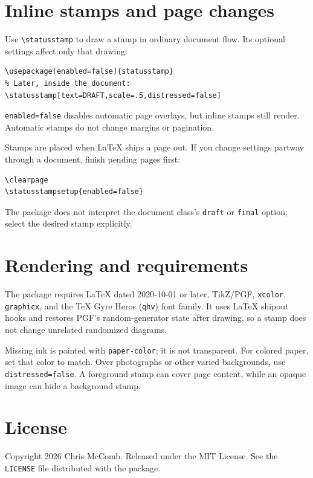 \documentclass[11pt]{article}
\newcommand{\option}[1]{\texttt{#1}}
\begin{document}
\clearpage
\section{Inline stamps and page changes}

Use \verb|\statusstamp| to draw a stamp in ordinary document flow. Its
optional settings affect only that drawing:

\begin{verbatim}
\usepackage[enabled=false]{statusstamp}
% Later, inside the document:
\statusstamp[text=DRAFT,scale=.5,distressed=false]
\end{verbatim}

\verb|enabled=false| disables automatic page overlays, but inline stamps
still render. Automatic stamps do not change margins or pagination.

Stamps are placed when LaTeX ships a page out. If you change settings partway
through a document, finish pending pages first:

\begin{verbatim}
\clearpage
\statusstampsetup{enabled=false}
\end{verbatim}

The package does not interpret the document class's \texttt{draft} or
\texttt{final} option; select the desired stamp explicitly.

\section{Rendering and requirements}

The package requires LaTeX dated 2020-10-01 or later, TikZ/PGF,
\texttt{xcolor}, \texttt{graphicx}, and the TeX Gyre Heros
(\texttt{qhv}) font family. It uses LaTeX shipout hooks and restores PGF's
random-generator state after drawing, so a stamp does not change unrelated
randomized diagrams.

Missing ink is painted with \option{paper-color}; it is not transparent.
For colored paper, set that color to match. Over photographs or other varied
backgrounds, use \verb|distressed=false|. A foreground stamp can cover
page content, while an opaque image can hide a background stamp.

\section{License}

Copyright 2026 Chris McComb. Released under the MIT License. See the
\texttt{LICENSE} file distributed with the package.
\end{document}
